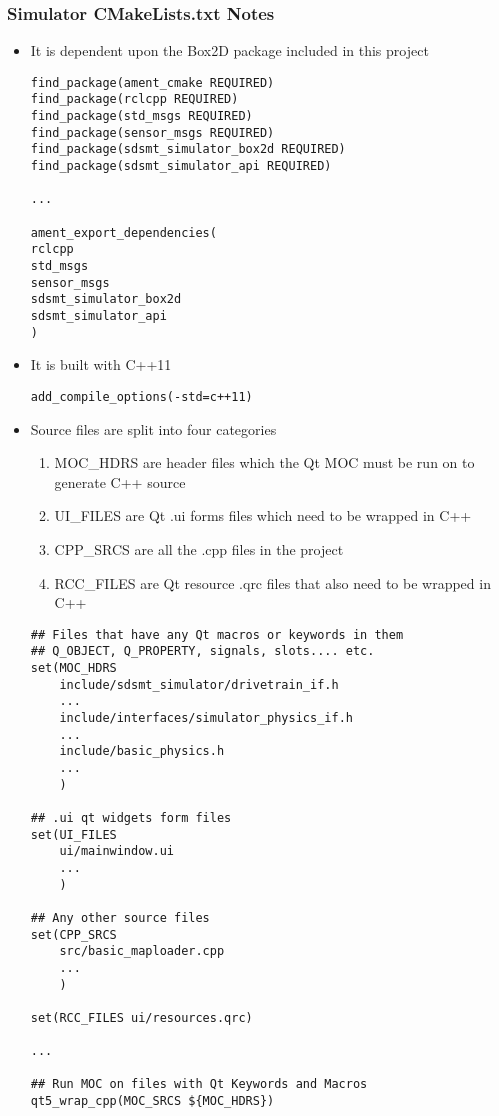\subsubsection*{Simulator CMakeLists.txt Notes}
\begin{itemize}
	\item It is dependent upon the Box2D package included in this project
	\begin{lstlisting}
find_package(ament_cmake REQUIRED)
find_package(rclcpp REQUIRED)
find_package(std_msgs REQUIRED)
find_package(sensor_msgs REQUIRED)
find_package(sdsmt_simulator_box2d REQUIRED)
find_package(sdsmt_simulator_api REQUIRED)

...

ament_export_dependencies(    
rclcpp
std_msgs
sensor_msgs
sdsmt_simulator_box2d
sdsmt_simulator_api
)
	\end{lstlisting}
	\item It is built with C++11
	\begin{lstlisting}
add_compile_options(-std=c++11)
	\end{lstlisting}
	\item Source files are split into four categories
	\begin{enumerate}
		\item MOC\_HDRS are header files which the Qt MOC must be run on to generate C++ source
		\item UI\_FILES are Qt .ui forms files which need to be wrapped in C++
		\item CPP\_SRCS are all the .cpp files in the project
		\item RCC\_FILES are Qt resource .qrc files that also need to be wrapped in C++
	\end{enumerate}
	\begin{lstlisting}
## Files that have any Qt macros or keywords in them
## Q_OBJECT, Q_PROPERTY, signals, slots.... etc.
set(MOC_HDRS
    include/sdsmt_simulator/drivetrain_if.h
    ...
    include/interfaces/simulator_physics_if.h
    ...
    include/basic_physics.h
    ...
    )

## .ui qt widgets form files
set(UI_FILES
    ui/mainwindow.ui
    ...
    )

## Any other source files
set(CPP_SRCS
    src/basic_maploader.cpp
    ...
    )

set(RCC_FILES ui/resources.qrc)

...

## Run MOC on files with Qt Keywords and Macros
qt5_wrap_cpp(MOC_SRCS ${MOC_HDRS})


\end{lstlisting}
\end{itemize}
